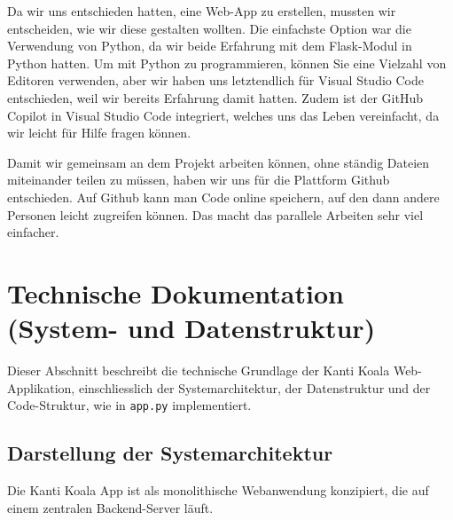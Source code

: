 \documentclass[12pt,a4paper]{report}
\begin{document}
Da wir uns entschieden hatten, eine Web-App zu erstellen, mussten wir entscheiden, wie wir diese gestalten wollten. Die einfachste Option war die Verwendung von Python, da wir beide Erfahrung mit dem Flask-Modul in Python hatten. Um mit Python zu programmieren, können Sie eine Vielzahl von Editoren verwenden, aber wir haben uns letztendlich für Visual Studio Code entschieden, weil wir bereits Erfahrung damit hatten. Zudem ist der GitHub Copilot in Visual Studio Code integriert, welches uns das Leben vereinfacht, da wir leicht für Hilfe fragen können.

Damit wir gemeinsam an dem Projekt arbeiten können, ohne ständig Dateien miteinander teilen zu müssen, haben wir uns für die Plattform Github entschieden. Auf Github kann man Code online speichern, auf den dann andere Personen leicht zugreifen können. Das macht das parallele Arbeiten sehr viel einfacher. 


\section{Technische Dokumentation (System- und Datenstruktur)}
Dieser Abschnitt beschreibt die technische Grundlage der Kanti Koala Web-Applikation, einschliesslich der Systemarchitektur, der Datenstruktur und der Code-Struktur, wie in \texttt{app.py} implementiert.

\subsection{Darstellung der Systemarchitektur}
Die Kanti Koala App ist als monolithische Webanwendung konzipiert, die auf einem zentralen Backend-Server läuft.
\end{document}
